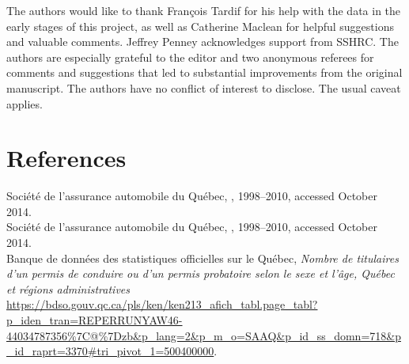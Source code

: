\documentclass[11pt]{paper}
\begin{document}
The authors would like to thank 
Fran\c{c}ois Tardif for his help with the data in the early stages of this project, 
as well as  
Catherine Maclean 
for helpful suggestions and valuable comments. 
Jeffrey Penney acknowledges support from SSHRC. 
The authors are especially grateful to the editor and two anonymous referees 
for comments and suggestions that led to substantial improvements from the original manuscript. 
The authors have no conflict of interest to disclose. 
The usual caveat applies.



\section*{References}

\noindent Soci\'{e}t\'{e} de l'assurance automobile du Qu\'{e}bec,
, 
1998--2010, 
accessed October 2014. \\

\noindent Soci\'{e}t\'{e} de l'assurance automobile du Qu\'{e}bec,
, 
1998--2010, 
accessed October 2014. \\


\noindent Banque de donn\'{e}es des statistiques officielles sur le Qu\'{e}bec, 
\emph{Nombre de titulaires d'un permis de conduire ou d'un permis probatoire selon le sexe et l'\^{a}ge, Qu\'{e}bec et r\'{e}gions administratives}
\url{https://bdso.gouv.qc.ca/pls/ken/ken213_afich_tabl.page_tabl?p_iden_tran=REPERRUNYAW46-44034787356%7C@%7Dzb&p_lang=2&p_m_o=SAAQ&p_id_ss_domn=718&p_id_raprt=3370#tri_pivot_1=500400000}. 
\end{document}
